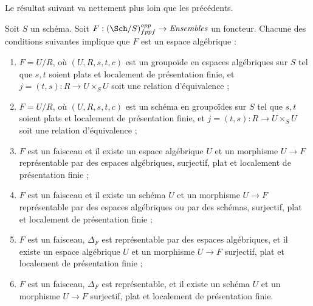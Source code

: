 \noindent
Le résultat suivant va nettement plus loin que les précédents.

\begin{theorem}
\label{theorem-final-bootstrap}
Soit $S$ un schéma.
Soit $F : (\Sch/S)_{fppf}^{opp} \to \textit{Ensembles}$ un foncteur.
Chacune des conditions suivantes implique que $F$ est un espace algébrique :
\begin{enumerate}
\item $F = U/R$, où $(U, R, s, t, c)$ est un groupoïde en espaces algébriques
sur $S$ tel que $s, t$ soient plats et localement de présentation finie, et
$j = (t, s) : R \to U \times_S U$ soit une relation d'équivalence ;
\item $F = U/R$, où $(U, R, s, t, c)$ est un schéma en groupoïdes
sur $S$ tel que $s, t$ soient plats et localement de présentation finie, et
$j = (t, s) : R \to U \times_S U$ soit une relation d'équivalence ;
\item $F$ est un faisceau et il existe un espace algébrique $U$ et un morphisme
$U \to F$ représentable par des espaces algébriques,
surjectif, plat et localement de présentation finie ;
\item $F$ est un faisceau et il existe un schéma $U$ et un morphisme
$U \to F$ représentable par des espaces algébriques ou par des schémas,
surjectif, plat et localement de présentation finie ;
\item $F$ est un faisceau, $\Delta_F$ est représentable par des espaces algébriques,
et il existe un espace algébrique $U$ et un morphisme $U \to F$
surjectif, plat et localement de présentation finie ;
\item $F$ est un faisceau, $\Delta_F$ est représentable,
et il existe un schéma $U$ et un morphisme $U \to F$
surjectif, plat et localement de présentation finie.
\end{enumerate}
\end{theorem}

